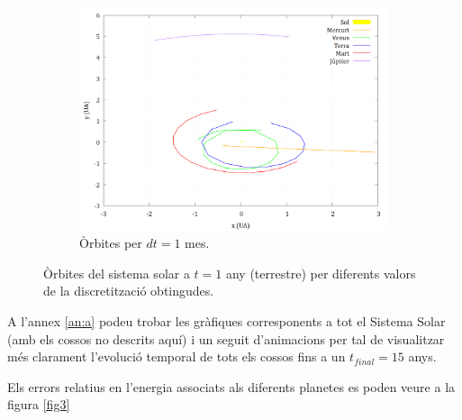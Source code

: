 \documentclass[10pt, twoside, a4paper]{article}
\begin{document}
\begin{figure}[h]
\begin{subfigure}[b]{0.32\linewidth}
        \centering
        \includegraphics[width=\linewidth]{../sist_solar/orbites_euler_1_d1mes.png}
        \caption{Òrbites per $dt=1$ mes.}
        \label{fig:euler_implicit_errors}
    \end{subfigure}
    
    \caption{Òrbites del sistema solar a $t=1$ any (terrestre) per diferents valors de la discretització obtingudes.}
    \label{fig1}
\end{figure}

A l'annex \ref{an:a} podeu trobar les gràfiques corresponents a tot el Sistema Solar (amb els cossos no descrits aquí) i un seguit d'animacions per tal de visualitzar més clarament l'evolució temporal de tots els cossos fins a un $t_{final}=15$ anys.

Els errors relatius en l'energia associats als diferents planetes es poden veure a la figura \ref{fig3}
\end{document}
